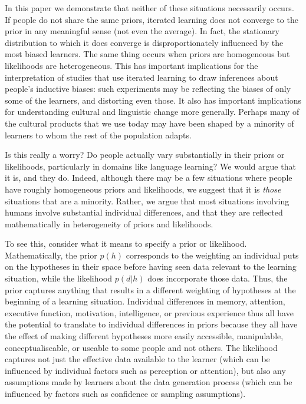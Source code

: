 \documentclass[doc]{apa6}
\begin{document}
In this paper we demonstrate that neither of these situations necessarily occurs. If people do not share the same priors, iterated learning does not converge to the prior in any meaningful sense (not even the average). In fact, the stationary distribution to which it does converge is disproportionately influenced by the most biased learners. The same thing occurs when priors are homogeneous but likelihoods are heterogeneous. This has important implications for the interpretation of studies that use iterated learning to draw inferences about people's inductive biases: such experiments may be reflecting the biases of only some of the learners, and distorting even those. It also has important implications for understanding cultural and linguistic change more generally. Perhaps many of the cultural products that we use today may have been shaped by a minority of learners to whom the rest of the population adapts.

Is this really a worry? Do people actually vary substantially in their priors or likelihoods, particularly in domains like language learning? We would argue that it is, and they do. Indeed, although there may be a few situations where people have roughly homogeneous priors and likelihoods, we suggest that it is {\it those} situations that are a minority. Rather, we argue that most situations involving humans involve substantial individual differences, and that they are reflected mathematically in heterogeneity of priors and likelihoods.

To see this, consider what it means to specify a prior or likelihood. Mathematically, the prior $p(h)$ corresponds to the weighting an individual puts on the hypotheses in their space before having seen data relevant to the learning situation, while the likelihood $p(d|h)$ does incorporate those data. Thus, the prior captures anything that results in a different weighting of hypotheses at the beginning of a learning situation. Individual differences in memory, attention, executive function, motivation, intelligence, or previous experience thus all have the potential to translate to individual differences in priors because they all have the effect of making different hypotheses more easily accessible, manipulable, conceptualiseable, or useable to some people and not others. The likelihood captures not just the effective data available to the learner (which can be influenced by individual factors such as perception or attention), but also any assumptions made by learners about the data generation process (which can be influenced by factors such as confidence or sampling assumptions).
\end{document}
